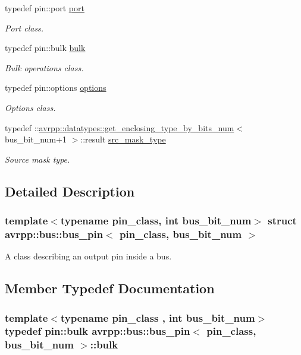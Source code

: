 \begin{DoxyCompactItemize}
typedef pin::port \hyperlink{structavrpp_1_1bus_1_1bus__pin_a771525e4bdbb69d510340efea54853b2}{port}
\begin{DoxyCompactList}\small\item\em Port class. \item\end{DoxyCompactList}\item 
typedef pin::bulk \hyperlink{structavrpp_1_1bus_1_1bus__pin_a197715212881b680e382a3f64bb536e7}{bulk}
\begin{DoxyCompactList}\small\item\em Bulk operations class. \item\end{DoxyCompactList}\item 
typedef pin::options \hyperlink{structavrpp_1_1bus_1_1bus__pin_ac25ba32b110195ab3b0740a87d23beb8}{options}
\begin{DoxyCompactList}\small\item\em Options class. \item\end{DoxyCompactList}\item 
typedef ::\hyperlink{structavrpp_1_1datatypes_1_1get__enclosing__type__by__bits__num}{avrpp::datatypes::get\_\-enclosing\_\-type\_\-by\_\-bits\_\-num}$<$ bus\_\-bit\_\-num+1 $>$::result \hyperlink{structavrpp_1_1bus_1_1bus__pin_a141afbd0ca9f7f94f69a74bbb26515ea}{src\_\-mask\_\-type}
\begin{DoxyCompactList}\small\item\em Source mask type. \item\end{DoxyCompactList}\end{DoxyCompactItemize}


\subsection{Detailed Description}
\subsubsection*{template$<$typename pin\_\-class, int bus\_\-bit\_\-num$>$ struct avrpp::bus::bus\_\-pin$<$ pin\_\-class, bus\_\-bit\_\-num $>$}

A class describing an output pin inside a bus. 

\subsection{Member Typedef Documentation}
\hypertarget{structavrpp_1_1bus_1_1bus__pin_a197715212881b680e382a3f64bb536e7}{
\subsubsection[{bulk}]{\setlength{\rightskip}{0pt plus 5cm}template$<$typename pin\_\-class , int bus\_\-bit\_\-num$>$ typedef pin::bulk {\bf avrpp::bus::bus\_\-pin}$<$ pin\_\-class, bus\_\-bit\_\-num $>$::{\bf bulk}}}
\label{structavrpp_1_1bus_1_1bus__pin_a197715212881b680e382a3f64bb536e7}


